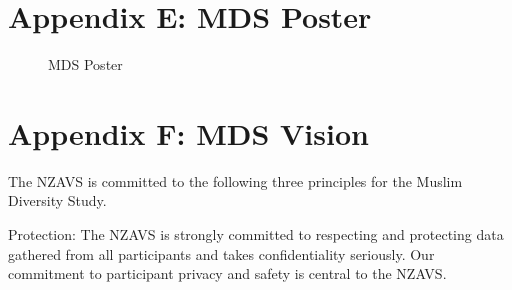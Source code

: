 \documentclass[
]{interact}
\begin{document}
\newpage{}

\section{Appendix E: MDS Poster}\label{appendix-e-mds-poster}

\begin{figure}


\caption{\label{fig-appendfig1}MDS Poster}

\end{figure}%

\newpage{}

\section{Appendix F: MDS Vision}\label{appendix-f-mds-vision}

The NZAVS is committed to the following three principles for the Muslim
Diversity Study.

\noindent Protection: The NZAVS is strongly committed to respecting and
protecting data gathered from all participants and takes confidentiality
seriously. Our commitment to participant privacy and safety is central
to the NZAVS.
\end{document}
